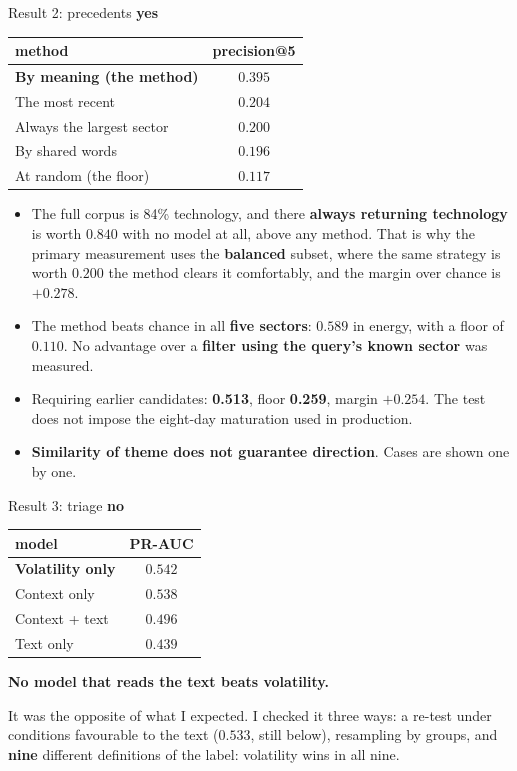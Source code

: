 \documentclass[aspectratio=169]{beamer}
\begin{document}
\begin{frame}{Result 2: precedents \textcolor{green!50!black}{\textbf{yes}}}
\centering
\begin{tabular}{lc}
\toprule
\textbf{method} & \textbf{precision@5} \\
\midrule
\textbf{By meaning (the method)} & $\mathbf{0.395}$ \\
The most recent & $0.204$ \\
Always the largest sector & $0.200$ \\
By shared words & $0.196$ \\
At random (the floor) & $0.117$ \\
\bottomrule
\end{tabular}
\vspace{2mm}

\begin{itemize}
  \small
  \item The full corpus is 84\% technology, and there \textbf{always returning technology} is
        worth $0.840$ with no model at all, above any method. That is why the primary
        measurement uses the \textbf{balanced} subset, where the same strategy is worth $0.200$
        the method clears it comfortably, and the margin over chance is $+0.278$.
  \item The method beats chance in all \textbf{five sectors}: $0.589$ in energy, with a floor
        of $0.110$. No advantage over a \textbf{filter using the query's known sector} was measured.
  \item Requiring earlier candidates: \textbf{0.513}, floor \textbf{0.259}, margin
        \textbf{$+0.254$}. The test does not impose the eight-day maturation used in production.
  \item \textbf{Similarity of theme does not guarantee direction}. Cases are shown one by one.
\end{itemize}
\end{frame}

\begin{frame}{Result 3: triage \textcolor{red!60!black}{\textbf{no}}}
\centering
\begin{tabular}{lc}
\toprule
\textbf{model} & \textbf{PR-AUC} \\
\midrule
\textbf{Volatility only} & $\mathbf{0.542}$ \\
Context only & $0.538$ \\
Context + text & $0.496$ \\
Text only & $0.439$ \\
\bottomrule
\end{tabular}
\vspace{3mm}

\begin{center}
\textbf{No model that reads the text beats volatility.}
\end{center}
\vspace{2mm}
\footnotesize
It was the opposite of what I expected. I checked it three ways:
a re-test under conditions favourable to the text ($0.533$, still below),
resampling by groups, and \textbf{nine} different definitions of the label: volatility wins
in all nine.
\end{frame}
\end{document}

